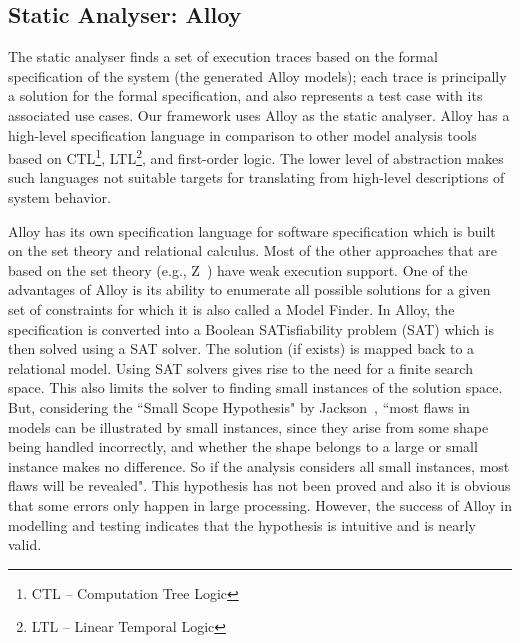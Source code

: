 \subsection{Static Analyser: Alloy}
\label{sec:framework-overview-static-analyser}
The static analyser finds a set of execution traces based on the formal specification of the system (the generated Alloy models); each trace is principally a solution for the formal specification, and also represents a test case with its associated use cases. Our framework uses Alloy as the static analyser. Alloy has a high-level specification language in comparison to other model analysis tools  based on CTL\footnote{CTL – Computation Tree Logic}, LTL\footnote{LTL – Linear Temporal Logic}, and first-order logic. The lower level of abstraction makes such languages not suitable targets for translating from high-level descriptions of system behavior.

Alloy has its own specification language for software specification which is built on the set theory and relational calculus. Most of the other approaches that are based on the set theory (e.g., Z~\cite{Spivey1992}) have weak execution support. One of the advantages of Alloy is its ability to enumerate all possible solutions for a given set of constraints for which it is also called a Model Finder. In Alloy, the specification is converted into a Boolean SATisfiability problem (SAT) which is then solved using a SAT solver. The solution (if exists) is mapped back to a relational model. Using SAT solvers gives rise to the need for a finite search space. This also limits the solver to finding small instances of the solution space. But, considering the ``Small Scope Hypothesis" by Jackson~\cite{Jackson2012}, ``most flaws in models can be illustrated by small instances, since they arise from some shape being handled incorrectly, and whether the shape belongs to a large or small instance makes no difference. So if the analysis considers all small instances, most flaws will be revealed". This hypothesis has not been proved and also it is obvious that some errors only happen in large processing. However, the success of Alloy in modelling and testing indicates that the hypothesis is intuitive and is nearly valid.


